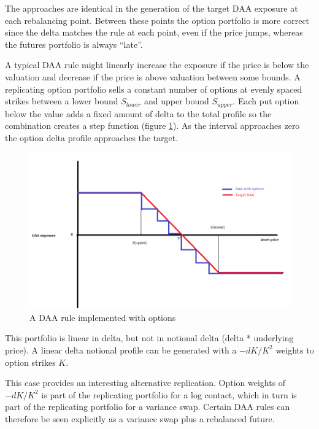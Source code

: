 \documentclass[12pt]{article}
\begin{document}
The approaches are identical in the generation of the target DAA exposure at each rebalancing point. Between these points the option portfolio is more correct since the delta matches the rule at each point, even if the price jumps, whereas the futures portfolio is always ``late''. 


A typical DAA rule might linearly increase the exposure if the price is below the valuation and decrease if the price is above valuation between some bounds. A replicating option portfolio sells a constant number of options at evenly spaced strikes between a lower bound $S_{lower}$ and upper bound $S_{upper}$. Each put option below the value adds a fixed amount of delta to the total profile so the combination creates a step function (figure \ref{fig:DAARuleLimitedStrikes}). As the interval approaches zero the option delta profile approaches the target.

\begin{figure}[t] 
\includegraphics[width=12cm]{figs/DAARuleLimitedStrikes.png}
\centering
\caption{A DAA rule implemented with options}
\label{fig:DAARuleLimitedStrikes}
\end{figure}

This portfolio is linear in delta, but not in notional delta (delta * underlying price). A linear delta notional profile can be generated with a $-dK/K^2$ weights to option strikes $K$. 

This case provides an interesting alternative replication. Option weights of $-dK/K^2$ is part of the replicating portfolio for a log contact, which in turn is part of the replicating portfolio for a variance swap. Certain DAA rules can therefore be seen explicitly as a variance swap plus a rebalanced future.
\end{document}
